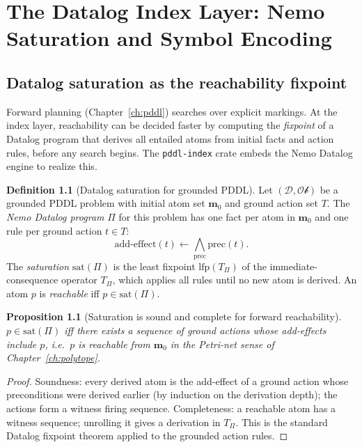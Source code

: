 \documentclass[11pt,oneside]{book}
\theoremstyle{definition}
\newtheorem{definition}{Definition}[chapter]
\theoremstyle{plain}
\newtheorem{proposition}[theorem]{Proposition}
\theoremstyle{remark}
\newcommand{\code}[1]{\texttt{#1}}
\begin{document}
\chapter{The Datalog Index Layer: Nemo Saturation and Symbol Encoding}
\label{ch:pddlindex}

\section{Datalog saturation as the reachability fixpoint}

Forward planning (Chapter~\ref{ch:pddl}) searches over explicit markings. At the index
layer, reachability can be decided faster by computing the \emph{fixpoint} of a Datalog
program that derives all entailed atoms from initial facts and action rules, before any
search begins. The \code{pddl-index} crate embeds the Nemo Datalog engine to realize this.

\begin{definition}[Datalog saturation for grounded PDDL]\label{def:saturation}
Let $(\mathcal{D},\mathcal{Ob})$ be a grounded PDDL problem with initial atom set $\bm
m_0$ and ground action set $T$. The \emph{Nemo Datalog program} $\Pi$ for this problem
has one fact per atom in $\bm m_0$ and one rule per ground action $t\in T$:
\[
\text{add-effect}(t) \leftarrow \bigwedge_{\text{prec}} \text{prec}(t).
\]
The \emph{saturation} $\mathrm{sat}(\Pi)$ is the least fixpoint $\mathrm{lfp}(T_{\Pi})$
of the immediate-consequence operator $T_{\Pi}$, which applies all rules until no new
atom is derived. An atom $p$ is \emph{reachable} iff $p\in\mathrm{sat}(\Pi)$.
\end{definition}

\begin{proposition}[Saturation is sound and complete for forward reachability]
\label{prop:satcorrect}
$p\in\mathrm{sat}(\Pi)$ iff there exists a sequence of ground actions whose add-effects
include $p$, i.e.\ $p$ is reachable from $\bm m_0$ in the Petri-net sense of
Chapter~\ref{ch:polytope}.
\end{proposition}

\begin{proof}
Soundness: every derived atom is the add-effect of a ground action whose preconditions
were derived earlier (by induction on the derivation depth); the actions form a witness
firing sequence. Completeness: a reachable atom has a witness sequence; unrolling it
gives a derivation in $T_{\Pi}$. This is the standard Datalog fixpoint theorem
\cite{kowalski1974,lloyd1987} applied to the grounded action rules.
\end{proof}
\end{document}
